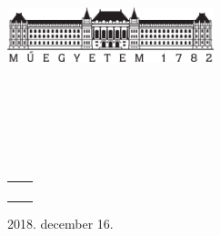 \hypersetup{pageanchor=false}
\begin{titlepage}
	\begin{center}
		\includegraphics[width=60mm,keepaspectratio]{figures/bme_logo.pdf}\\
		\vspace{0.3cm}
		\textbf{\bme}\\
		\textmd{\vik}\\
		\textmd{\viktanszek}\\[5cm]

		\vspace{0.4cm}
		{\huge \bfseries \vikcim}\\[0.8cm]
		\kovi{}
		\szarnyasg{}
		\vspace{0.5cm}
		
		\vspace{0.5cm}
		\textsc{\Large \vikdoktipus}\\[4cm]

		{
			\renewcommand{\arraystretch}{0.85}
			\begin{tabular}{cc}
				\makebox[7cm]{\emph{\keszitette}} & \makebox[7cm]{\emph{\konzulens}} \\ \noalign{\smallskip}
				\makebox[7cm]{\szerzo} & \makebox[7cm]{\vikkonzulensA} \\
				& \makebox[7cm]{\vikkonzulensB} \\
				& \makebox[7cm]{\vikkonzulensC} \\
			\end{tabular}
		}

		\vfill
		{\large 2018. december 16.}
	\end{center}
\end{titlepage}
\hypersetup{pageanchor=false}

